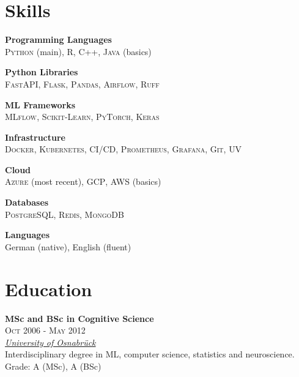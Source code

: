 \documentclass[a4paper,9.5pt]{article}
\begin{document}
\vspace{3mm}
\noindent
\begin{minipage}[t]{0.32\textwidth}

\section{Skills}
\small

\vspace{1.5mm}
\textbf{Programming Languages}\\
\textsc{Python} (main), \textsc{R}, \textsc{C++}, \textsc{Java} (basics)
\vspace{1.5mm}

\textbf{Python Libraries}\\
\textsc{FastAPI}, \textsc{Flask}, \textsc{Pandas}, \textsc{Airflow}, \textsc{Ruff}
\vspace{1.5mm}

\textbf{ML Frameworks}\\
\textsc{MLflow}, \textsc{Scikit-Learn}, \textsc{PyTorch}, \textsc{Keras}
\vspace{1.5mm}

\textbf{Infrastructure}\\
\textsc{Docker}, \textsc{Kubernetes}, \textsc{CI/CD}, \textsc{Prometheus}, \textsc{Grafana}, \textsc{Git}, \textsc{UV}
\vspace{1.5mm}

\textbf{Cloud}\\
\textsc{Azure} (most recent), \textsc{GCP}, \textsc{AWS} (basics)
\vspace{1.5mm}

\textbf{Databases}\\
\textsc{PostgreSQL}, \textsc{Redis}, \textsc{MongoDB}
\vspace{1.5mm}

\textbf{Languages}\\
German (native), English (fluent)
\vspace{3mm}

\section{Education}
\small
\vspace{1.5mm}

\textbf{MSc and BSc in Cognitive Science}\\
\textsc{Oct 2006 - May 2012}\\
\textit{\href{https://www.ikw.uni-osnabrueck.de/en}{University of Osnabrück}}\\
Interdisciplinary degree in ML, computer science, statistics and neuroscience.\\
Grade: A (MSc), A (BSc)
\vspace{3mm}


\end{minipage}
\end{document}
